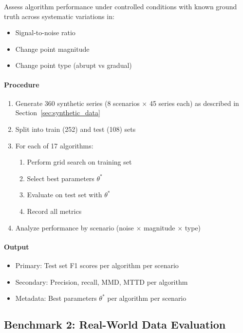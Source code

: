 \documentclass[journal,article,submit,pdftex,moreauthors]{Definitions/mdpi}
\begin{document}
Assess algorithm performance under controlled conditions with known ground truth across systematic variations in:
\begin{itemize}
    \item Signal-to-noise ratio
    \item Change point magnitude
    \item Change point type (abrupt vs gradual)
\end{itemize}

\paragraph{Procedure}

\begin{enumerate}
    \item Generate 360 synthetic series (8 scenarios $\times$ 45 series each) as described in Section~\ref{sec:synthetic_data}
    \item Split into train (252) and test (108) sets
    \item For each of 17 algorithms:
    \begin{enumerate}
        \item Perform grid search on training set
        \item Select best parameters $\theta^*$
        \item Evaluate on test set with $\theta^*$
        \item Record all metrics
    \end{enumerate}
    \item Analyze performance by scenario (noise $\times$ magnitude $\times$ type)
\end{enumerate}

\paragraph{Output}

\begin{itemize}
    \item Primary: Test set F1 scores per algorithm per scenario
    \item Secondary: Precision, recall, MMD, MTTD per algorithm
    \item Metadata: Best parameters $\theta^*$ per algorithm per scenario
\end{itemize}

\subsection{Benchmark 2: Real-World Data Evaluation}
\label{sec:benchmark2}
\end{document}
